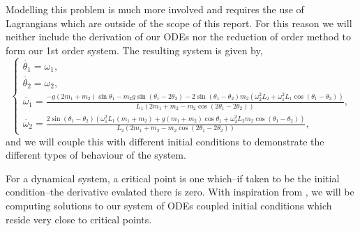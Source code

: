\documentclass[12pt, twoside]{report}
\theoremstyle{plain}
\theoremstyle{definition}
\theoremstyle{definition}
\begin{document}
            Modelling this problem is much more involved and 
            requires the use of Lagrangians which are outside of the scope
            of this report. For this reason we will neither include the 
            derivation of our ODEs nor the reduction of order method to form 
            our 1st order system. The resulting system is given by,
            \begin{equation}
            \label{eq:double_pendulum_odes}
                \begin{cases}
                    \dot{\theta_1} = \omega_1,\\
                    \dot{\theta_2} = \omega_2,\\
                    \dot{\omega_1} = \frac{-g (2 m_1 + m_2) \sin{\theta_1} - m_2 g \sin(\theta_1 - 2 \theta_2) - 2 \sin(\theta_1 - \theta_2) m_2 (\omega_2^2 L_2 + \omega_1^2 L_1 \cos(\theta_1 - \theta_2))}{L_1 (2 m_1 + m_2 - m_2 \cos(2 \theta_1 - 2 \theta_2))},\\
                    \dot{\omega_2} = \frac{2 \sin(\theta_1 - \theta_2)(\omega_1^2 L_1 (m_1 + m_2) + g (m_1 + m_2) \cos{\theta_1} + \omega_2^2 L_2 m_2 \cos(\theta_1 - \theta_2))}{L_2 (2 m_1 + m_2 - m_2 \cos(2 \theta_1 - 2 \theta_2))},
                \end{cases}
            \end{equation} 
            and we will couple this with different initial conditions to 
            demonstrate the different types of behaviour of the system.

            For a dynamical system, a critical point is one which--if taken to
            be the initial condition--the derivative evalated there is zero.
            With inspiration from \cite{mit}, we will be computing solutions
            to our system of ODEs coupled initial conditions which reside
            very close to critical points.
\end{document}
